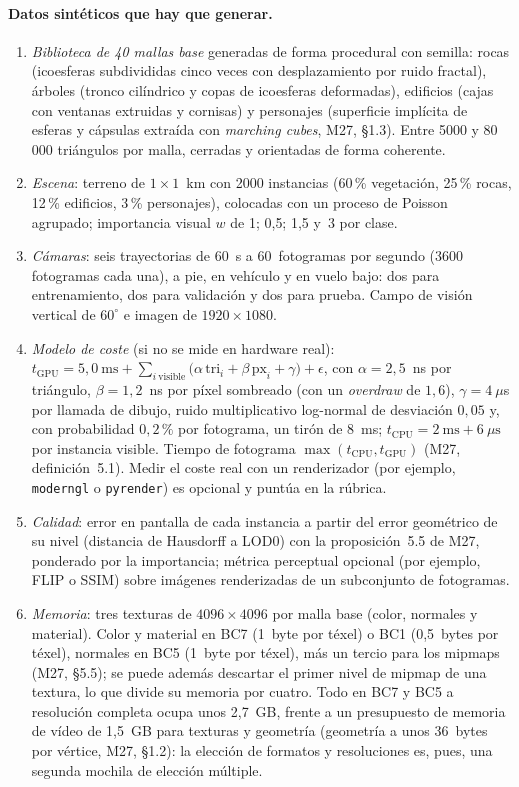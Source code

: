 \paragraph{Datos sintéticos que hay que generar.}
\begin{enumerate}[label=(\roman*)]
  \item \emph{Biblioteca de 40 mallas base} generadas de forma procedural con semilla: rocas (icoesferas subdivididas cinco veces con desplazamiento por ruido fractal), árboles (tronco cilíndrico y copas de icoesferas deformadas), edificios (cajas con ventanas extruidas y cornisas) y personajes (superficie implícita de esferas y cápsulas extraída con \emph{marching cubes}, M27, §1.3). Entre 5000 y 80\,000 triángulos por malla, cerradas y orientadas de forma coherente.
  \item \emph{Escena}: terreno de $1\times 1$~km con 2000 instancias (60\,\% vegetación, 25\,\% rocas, 12\,\% edificios, 3\,\% personajes), colocadas con un proceso de Poisson agrupado; importancia visual $w$ de 1; 0{,}5; 1{,}5 y~3 por clase.
  \item \emph{Cámaras}: seis trayectorias de 60~s a 60~fotogramas por segundo (3600 fotogramas cada una), a pie, en vehículo y en vuelo bajo: dos para entrenamiento, dos para validación y dos para prueba. Campo de visión vertical de $60^{\circ}$ e imagen de $1920\times 1080$.
  \item \emph{Modelo de coste} (si no se mide en hardware real): $t_{\mathrm{GPU}}=5{,}0~\text{ms}+\sum_{i\ \text{visible}}\bigl(\alpha\,\mathrm{tri}_i+\beta\,\mathrm{px}_i+\gamma\bigr)+\epsilon$, con $\alpha=2{,}5$~ns por triángulo, $\beta=1{,}2$~ns por píxel sombreado (con un \emph{overdraw} de $1{,}6$), $\gamma=4~\mu$s por llamada de dibujo, ruido multiplicativo log-normal de desviación $0{,}05$ y, con probabilidad $0{,}2\,\%$ por fotograma, un tirón de 8~ms; $t_{\mathrm{CPU}}=2~\text{ms}+6~\mu\text{s}$ por instancia visible. Tiempo de fotograma $\max(t_{\mathrm{CPU}},t_{\mathrm{GPU}})$ (M27, definición~5.1). Medir el coste real con un renderizador (por ejemplo, \texttt{moderngl} o \texttt{pyrender}) es opcional y puntúa en la rúbrica.
  \item \emph{Calidad}: error en pantalla de cada instancia a partir del error geométrico de su nivel (distancia de Hausdorff a LOD0) con la proposición~5.5 de M27, ponderado por la importancia; métrica perceptual opcional (por ejemplo, FLIP o SSIM) sobre imágenes renderizadas de un subconjunto de fotogramas.
  \item \emph{Memoria}: tres texturas de $4096\times 4096$ por malla base (color, normales y material). Color y material en BC7 (1~byte por téxel) o BC1 (0{,}5~bytes por téxel), normales en BC5 (1~byte por téxel), más un tercio para los mipmaps (M27, §5.5); se puede además descartar el primer nivel de mipmap de una textura, lo que divide su memoria por cuatro. Todo en BC7 y BC5 a resolución completa ocupa unos 2{,}7~GB, frente a un presupuesto de memoria de vídeo de 1{,}5~GB para texturas y geometría (geometría a unos 36~bytes por vértice, M27, §1.2): la elección de formatos y resoluciones es, pues, una segunda mochila de elección múltiple.
\end{enumerate}

